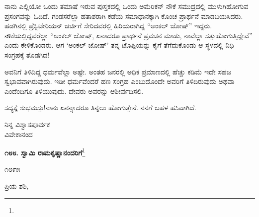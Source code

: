 ನಾನು ಎಲ್ಲಿಯೋ ಒಂದು ತಮಾಷೆ ಇರುವ ಪುಸ್ತಕದಲ್ಲಿ ಒಂದು ಅಮೆರಿಕನ್ ನೌಕೆ ಸಮುದ್ರದಲ್ಲಿ ಮುಳುಗಿಹೋಗುವ ಪ್ರಸಂಗವನ್ನು ಓದಿದೆ. ಗಂಡಸರೆಲ್ಲಾ ಹತಾಶರಾಗಿ ಕಡೆಯ ಸಮಾಧಾನಕ್ಕಾಗಿ ಕೊಂಚ ಪ್ರಾರ್ಥನೆ ಮಾಡಬಯಸಿದರು. ಹಡಗಿನಲ್ಲಿ ಪ್ರೆಸ್ಬಿಟೇರಿಯನ್ ಚರ್ಚಿಗೆ ಸೇರಿದವರಲ್ಲಿ ಹಿರಿಯರಾಗಿದ್ದ “ಅಂಕಲ್ ಜೋಷ್” ಇದ್ದರು. ನೌಕೆಯಲ್ಲಿದ್ದವರೆಲ್ಲಾ “ಅಂಕಲ್ ಜೋಷ್, ಏನಾದರೂ ಪ್ರಾರ್ಥನೆ ಪ್ರವಚನ ಮಾಡು, ನಾವೆಲ್ಲಾ ಸತ್ತುಹೋಗುತ್ತಿದ್ದೇವೆ” ಎಂದು ಕೇಳಿಕೊಂಡರು. ಆಗ ‘ಅಂಕಲ್ ಜೋಷ್’ ತನ್ನ ಟೊಪ್ಪಿಯನ್ನು ಕೈಗೆ ತೆಗೆದುಕೊಂಡು ಆ ಸ್ಥಳದಲ್ಲಿ ನಿಧಿ ಸಂಗ್ರಹಕ್ಕೆ ತೊಡಗಿದ!

ಅವನಿಗೆ ತಿಳಿದಿದ್ದ ಧರ್ಮವೆಲ್ಲಾ ಅಷ್ಟೇ. ಅಂತಹ ಜನರಲ್ಲಿ ಅಧಿಕ ಪ್ರಮಾಣದಲ್ಲಿ ಹೆಚ್ಚು ಕಡಿಮೆ ಇದೇ ಸಹಜ ಸ್ವಭಾವವಾಗಿರುವುದು. ಇಡೀ ಧರ್ಮವೆಂದರೆ ಹಣ ಸಂಗ್ರಹ ಎಂಬುದೊಂದೇ ಅವರಿಗೆ ತಿಳಿದಿರುವುದು ಅಥವಾ ಎಂದೆಂದಿಗೂ ತಿಳಿಯುವುದು. ದೇವರು ಅವರನ್ನು ಆಶೀರ್ವದಿಸಲಿ.

ಸದ್ಯಕ್ಕೆ ಶುಭಮಸ್ತು!ನಾನು ಏನನ್ನಾದರೂ ತಿನ್ನಲು ಹೋಗುತ್ತೇನೆ. ನನಗೆ ಬಹಳ ಹಸಿವಾಗಿದೆ.

\vspace{-0.5cm}

{\flushright
ನಿನ್ನ ವಿಶ್ವಾಸಪೂರ್ವಕ\\ವಿವೇಕಾನಂದ\par}

\begin{center}
\textbf{೧೮೮. ಸ್ವಾಮಿ ರಾಮಕೃಷ್ಣಾನಂದರಿಗೆ}\footnote{}
\end{center}

\vspace{-0.5cm}

\begin{flushright}
೧೮೯೫
\end{flushright}

\vspace{-0.3cm}

\noindent
ಪ್ರಿಯ ಶಶಿ,


